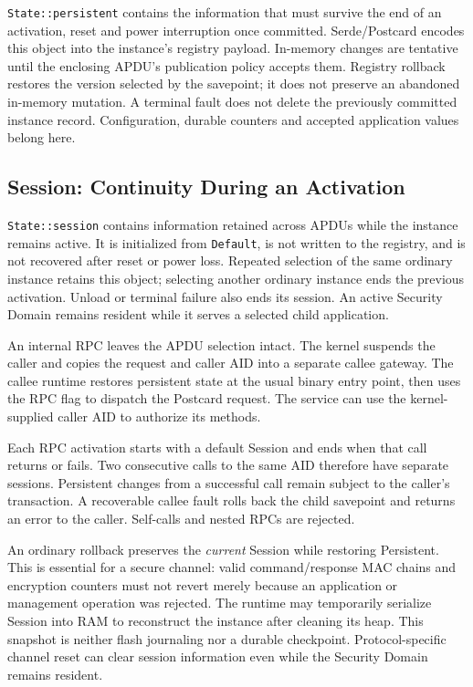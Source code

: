 \texttt{State::persistent} contains the information that must survive the
end of an activation, reset and power interruption once committed.
Serde/Postcard encodes this object into the instance's registry payload.
In-memory changes are tentative until the enclosing APDU's publication
policy accepts them. Registry rollback restores the version selected by the
savepoint; it does not preserve an abandoned in-memory mutation.
A terminal fault does not delete the previously committed instance record.
Configuration, durable counters and accepted application values belong here.

\subsection{Session: Continuity During an Activation}

\texttt{State::session} contains information retained across APDUs while the
instance remains active. It is initialized from \texttt{Default}, is not
written to the registry, and is not recovered after reset or power loss.
Repeated selection of the same ordinary instance retains this object;
selecting another ordinary instance ends the previous activation. Unload or
terminal failure also ends its session. An active Security Domain remains
resident while it serves a selected child application.

An internal RPC leaves the APDU selection intact. The kernel suspends the
caller and copies the request and caller AID into a separate callee gateway.
The callee runtime restores persistent state at the usual binary entry point,
then uses the RPC flag to dispatch the Postcard request. The service can use
the kernel-supplied caller AID to authorize its methods.

Each RPC activation starts with a default Session and ends when that call
returns or fails. Two consecutive calls to the same AID therefore have separate
sessions. Persistent changes from a successful call remain subject to the
caller's transaction. A recoverable callee fault rolls back the child savepoint
and returns an error to the caller. Self-calls and nested RPCs are rejected.

An ordinary rollback preserves the \emph{current} Session while restoring
Persistent. This is essential for a secure channel: valid command/response
MAC chains and encryption counters must not revert merely because an
application or management operation was rejected. The runtime may temporarily
serialize Session into RAM to reconstruct the instance after cleaning its
heap. This snapshot is neither flash journaling nor a durable checkpoint.
Protocol-specific channel reset can clear session information even while the
Security Domain remains resident.

